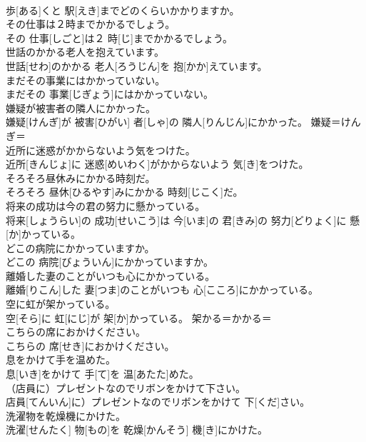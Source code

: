 \documentclass[8pt]{extreport}
\begin{document}
\begin{CJK}{UTF8}{min}
{\\	歩[ある]くと 駅[えき]までどのくらいかかりますか。	
\\	その仕事は２時までかかるでしょう。	
\\	その 仕事[しごと]は２ 時[じ]までかかるでしょう。	
\\	世話のかかる老人を抱えています。	
\\	世話[せわ]のかかる 老人[ろうじん]を 抱[かか]えています。	
\\	まだその事業にはかかっていない。	
\\	まだその 事業[じぎょう]にはかかっていない。	
\\	嫌疑が被害者の隣人にかかった。	
\\	嫌疑[けんぎ]が 被害[ひがい] 者[しゃ]の 隣人[りんじん]にかかった。	嫌疑＝けんぎ＝ 
\\	近所に迷惑がかからないよう気をつけた。	
\\	近所[きんじょ]に 迷惑[めいわく]がかからないよう 気[き]をつけた。	
\\	そろそろ昼休みにかかる時刻だ。	
\\	そろそろ 昼休[ひるやす]みにかかる 時刻[じこく]だ。	
\\	将来の成功は今の君の努力に懸かっている。	
\\	将来[しょうらい]の 成功[せいこう]は 今[いま]の 君[きみ]の 努力[どりょく]に 懸[か]かっている。	
\\	どこの病院にかかっていますか。	
\\	どこの 病院[びょういん]にかかっていますか。	
\\	離婚した妻のことがいつも心にかかっている。	
\\	離婚[りこん]した 妻[つま]のことがいつも 心[こころ]にかかっている。	
\\	空に虹が架かっている。	
\\	空[そら]に 虹[にじ]が 架[か]かっている。	架かる＝かかる＝ 
\\	こちらの席におかけください。	
\\	こちらの 席[せき]におかけください。	
\\	息をかけて手を温めた。	
\\	息[いき]をかけて 手[て]を 温[あたた]めた。	
\\	（店員に）プレゼントなのでリボンをかけて下さい。	
\\	店員[てんいん]に）プレゼントなのでリボンをかけて 下[くだ]さい。	
\\	洗濯物を乾燥機にかけた。	
\\	洗濯[せんたく] 物[もの]を 乾燥[かんそう] 機[き]にかけた。	
}
\end{CJK}
\end{document}
